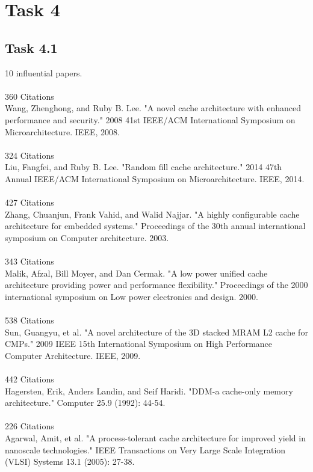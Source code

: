 \documentclass{article}
\begin{document}
	\section*{Task 4}
	\subsection*{Task 4.1}
	10 influential papers.\\
	\\
	360 Citations\\
	\noindent [1] Wang, Zhenghong, and Ruby B. Lee. "A novel cache architecture with enhanced performance and security." 2008 41st IEEE/ACM International Symposium on Microarchitecture. IEEE, 2008.\\
	\\
	324 Citations\\
	\noindent [2] Liu, Fangfei, and Ruby B. Lee. "Random fill cache architecture." 2014 47th Annual IEEE/ACM International Symposium on Microarchitecture. IEEE, 2014.\\
	\\
	427 Citations \\
	\noindent [3] Zhang, Chuanjun, Frank Vahid, and Walid Najjar. "A highly configurable cache architecture for embedded systems." Proceedings of the 30th annual international symposium on Computer architecture. 2003.\\
	\\
	343 Citations\\
	\noindent [4] Malik, Afzal, Bill Moyer, and Dan Cermak. "A low power unified cache architecture providing power and performance flexibility." Proceedings of the 2000 international symposium on Low power electronics and design. 2000.\\
	\\
	538 Citations\\
	\noindent [5] Sun, Guangyu, et al. "A novel architecture of the 3D stacked MRAM L2 cache for CMPs." 2009 IEEE 15th International Symposium on High Performance Computer Architecture. IEEE, 2009.\\
	\\
	442 Citations\\
	\noindent [6] Hagersten, Erik, Anders Landin, and Seif Haridi. "DDM-a cache-only memory architecture." Computer 25.9 (1992): 44-54.\\
	\\
	226 Citations\\
	\noindent [7] Agarwal, Amit, et al. "A process-tolerant cache architecture for improved yield in nanoscale technologies." IEEE Transactions on Very Large Scale Integration (VLSI) Systems 13.1 (2005): 27-38.\\
\end{document}
